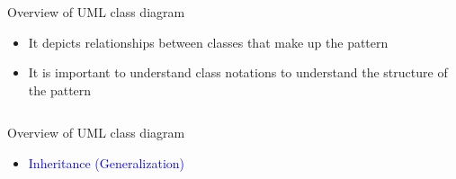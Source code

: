 \documentclass[13pt]{beamer}
\begin{document}
\begin{frame}{Overview of UML class diagram}
	\begin{itemize}
		\item It depicts relationships between classes that make up the pattern
		\item It is important to understand class notations to understand the structure of the 				  pattern
	\end{itemize}
	
\begin{columns}[T] %
\begin{column}{.5\textwidth}                                               
  	\begin{center}
	\end{center}                                                               
\end{column}%
                                                                           
\begin{column}{.5\textwidth}                                              
  	\begin{center}
	\end{center}                            
\end{column}%
\hfill%
\end{columns}
\end{frame}

\begin{frame}{Overview of UML class diagram}
	\begin{itemize}
		\item \textcolor{blue}{Inheritance (Generalization)}
	\end{itemize}
	
	\begin{center}
	\end{center}
\end{frame}
\end{document}
